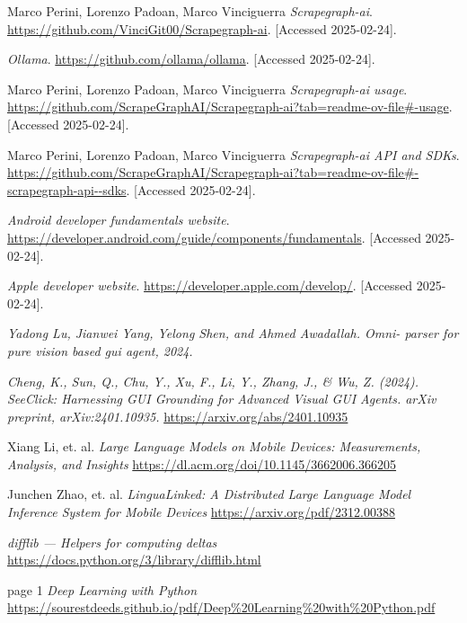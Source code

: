 \documentclass[licencjacka,en]{pracamgr}
\begin{document}
\begin{thebibliography}{99}
    Marco Perini, Lorenzo Padoan, Marco Vinciguerra
    \textit{Scrapegraph-ai}.
    \url{https://github.com/VinciGit00/Scrapegraph-ai}.
    [Accessed 2025-02-24].
    
    \textit{Ollama}.
    \url{https://github.com/ollama/ollama}.
    [Accessed 2025-02-24].
    
    Marco Perini, Lorenzo Padoan, Marco Vinciguerra
    \textit{Scrapegraph-ai usage}.
    \url{https://github.com/ScrapeGraphAI/Scrapegraph-ai?tab=readme-ov-file#-usage}.
    [Accessed 2025-02-24].
    
    Marco Perini, Lorenzo Padoan, Marco Vinciguerra
    \textit{Scrapegraph-ai API and SDKs}.
    \url{https://github.com/ScrapeGraphAI/Scrapegraph-ai?tab=readme-ov-file#-scrapegraph-api--sdks}.
    [Accessed 2025-02-24].
    
    \textit{Android developer fundamentals website}.
    \url{https://developer.android.com/guide/components/fundamentals}.
    [Accessed 2025-02-24].
    
    \textit{Apple developer website}.
    \url{https://developer.apple.com/develop/}.
    [Accessed 2025-02-24].
    
    \textit{Yadong Lu, Jianwei Yang, Yelong Shen, and Ahmed Awadallah. Omni-
    parser for pure vision based gui agent, 2024.}
    
    \textit{Cheng, K., Sun, Q., Chu, Y., Xu, F., Li, Y., Zhang, J., \& Wu, Z. (2024). SeeClick: Harnessing GUI Grounding for Advanced Visual GUI Agents. arXiv preprint, arXiv:2401.10935.} \url{https://arxiv.org/abs/2401.10935}
    
    Xiang Li, et. al.
    \textit{Large Language Models on Mobile Devices: Measurements, Analysis, and Insights}
    \url{https://dl.acm.org/doi/10.1145/3662006.366205}
    
    Junchen Zhao, et. al.
    \textit{LinguaLinked: A Distributed Large Language Model Inference System for Mobile Devices}
    \url{https://arxiv.org/pdf/2312.00388}
    
    \textit{difflib — Helpers for computing deltas}
    \url{https://docs.python.org/3/library/difflib.html}
    
    page 1
    \textit{Deep Learning with Python}
    \url{https://sourestdeeds.github.io/pdf/Deep%20Learning%20with%20Python.pdf}
    

\end{thebibliography}
\end{document}
